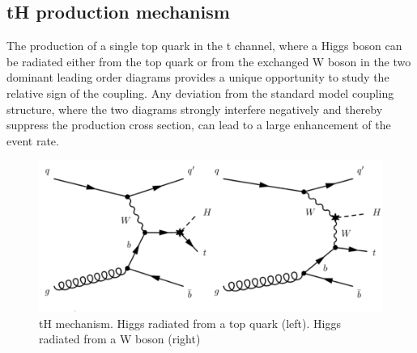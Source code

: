 \begin{linenumbers}
\section{tH production mechanism}
The production of a single top quark in the t channel, where a Higgs boson can be radiated
either from the top quark or from the exchanged W boson in the two dominant leading order
diagrams  provides a unique opportunity to study the relative sign of the coupling.
Any deviation from the standard model coupling structure, where the two diagrams strongly
interfere negatively and thereby suppress the production cross section, can lead to a large enhancement of the event rate.
\begin{center}
\begin{figure}[!htbp]
\centering
\includegraphics[scale=0.5]{Chapter1/newtHq.png}
\caption{tH mechanism. Higgs radiated from a top quark (left). Higgs radiated from a W boson (right) \protect \cite{bb}} \label{newth}
\end{figure}
\end{center}




\end{linenumbers}
